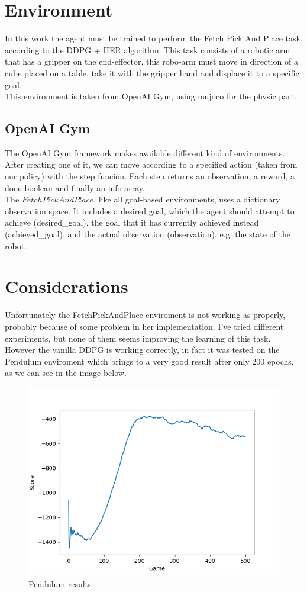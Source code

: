 \documentclass[12pt]{report}
\begin{document}
\chapter{Environment} 
In this work the agent must be trained to perform the Fetch Pick And Place task, according to the DDPG + HER algorithm. This task consists of a robotic arm that has a gripper on the end-effector, this robo-arm must move in direction of a cube placed on a table, take it with the gripper hand and displace it to a specific goal.\\
This environment is taken from OpenAI Gym, using mujoco for the physic part.

\section{OpenAI Gym}
The OpenAI Gym framework makes available different kind of environments. After creating one of it, we can move according to a specified action (taken from our policy) with the step funcion. Each step returns an observation, a reward, a done boolean and finally an info array. \\
The $FetchPickAndPlace$, like all goal-based environments, uses a dictionary observation space.
It includes a desired goal, which the agent should attempt to achieve (desired\_goal), the goal that it has currently achieved instead (achieved\_goal), and the actual observation (observation), e.g. the state of the robot.

\chapter{Considerations}
Unfortunately the FetchPickAndPlace enviroment is not working as properly, probably because of some problem in her implementation. I've tried different experiments, but none of them seems improving the learning of this task. However the vanilla DDPG is working correctly, in fact it was tested on the Pendulum enviroment which brings to a very good result after only 200 epochs, as we can see in the image below.

\begin{figure}[H]
    \begin{center}
    \includegraphics[scale=0.6]{Pendulum-v0.png}
    \end{center}
    \caption{Pendulum results}
    \centering
\end{figure}
\end{document}
